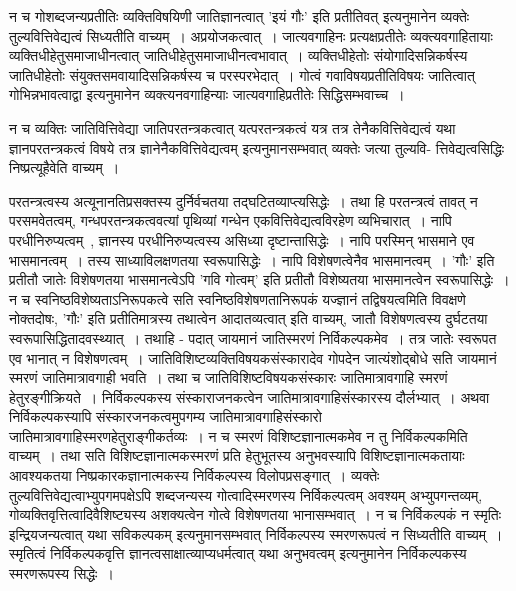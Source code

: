 				न च गोशब्दजन्यप्रतीतिः व्यक्तिविषयिणी जातिज्ञानत्वात् 'इयं गौः' इति प्रतीतिवत् इत्यनुमानेन व्यक्तेः तुल्यवित्तिवेद्यत्वं सिध्यतीति वाच्यम्~। अप्रयोजकत्वात्~। जात्यवगाहिनः प्रत्यक्षप्रतीतेः व्यक्त्यवगाहितायाः व्यक्तिधीहेतुसमाजाधीनत्वात् जातिधीहेतुसमाजाधीनत्वभावात्~। व्यक्तिधीहेतोः संयोगादिसन्निकर्षस्य जातिधीहेतोः संयुक्तसमवायादिसन्निकर्षस्य च परस्परभेदात्~। गोत्वं गवाविषयप्रतीतिविषयः जातित्वात् गोभिन्नभावत्वाद्वा इत्यनुमानेन व्यक्त्यनवगाहिन्याः जात्यवगाहिप्रतीतेः सिद्धिसम्भवाच्च~। 

				न च व्यक्तिः जातिवित्तिवेद्या जातिपरतन्त्रकत्वात् यत्परतन्त्रकत्वं यत्र तत्र तेनैकवित्तिवेद्यत्वं यथा ज्ञानपरतन्त्रकत्वं विषये तत्र ज्ञानेनैकवित्तिवेद्यत्वम् इत्यनुमानसम्भवात् व्यक्तेः जत्या तुल्यवि- त्तिवेद्यत्वसिद्धिः निष्प्रत्यूहैवेति वाच्यम्~।

				परतन्त्रत्वस्य अत्यूनानतिप्रसक्तस्य दुर्निर्वचतया तद्घटितव्याप्त्यसिद्धेः~। तथा हि परतन्त्रत्वं तावत् न परसमवेतत्वम्, गन्धपरतन्त्रकत्ववत्यां पृथिव्यां गन्धेन एकवित्तिवेद्यत्वविरहेण व्यभिचारात्~। नापि परधीनिरुप्यत्वम्~, ज्ञानस्य परधीनिरुप्यत्वस्य असिध्या दृष्टान्तासिद्धेः~। नापि परस्मिन् भासमाने एव भासमानत्वम्~। तस्य साध्याविलक्षणतया स्वरूपासिद्धेः~। नापि विशेषणत्वेनैव भासमानत्वम्~। 'गौः' इति प्रतीतौ जातेः विशेषणतया भासमानत्वेऽपि 'गवि गोत्वम्' इति प्रतीतौ विशेष्यतया भासमानत्वेन स्वरूपासिद्धेः~। न च स्वनिष्ठविशेष्यताऽनिरूपकत्वे सति स्वनिष्ठविशेषणतानिरूपकं यज्ज्ञानं तद्विषयत्वमिति विवक्षणे नोक्तदोषः, 'गौः' इति प्रतीतिमात्रस्य तथात्वेन आदातव्यत्वात् इति वाच्यम्, जातौ विशेषणत्वस्य दुर्घटतया स्वरूपासिद्धितादवस्थ्यात्~। तथाहि - पदात् जायमानं जातिस्मरणं निर्विकल्पकमेव~। तत्र जातेः स्वरूपत एव भानात् न विशेषणत्वम्~। जातिविशिष्टव्यक्तिविषयकसंस्कारादेव गोपदेन जात्यंशोद्बोधे सति जायमानं स्मरणं जातिमात्रावगाही भवति~। तथा च जातिविशिष्टविषयकसंस्कारः जातिमात्रावगाहि स्मरणं हेतुरङ्गीक्रियते~। निर्विकल्पकस्य संस्काराजनकत्वेन जातिमात्रावगाहिसंस्कारस्य दौर्लभ्यात्~। अथवा निर्विकल्पकस्यापि संस्कारजनकत्वमुपगम्य जातिमात्रावगाहिसंस्कारो जातिमात्रावगाहिस्मरणहेतुराङ्गीकर्तव्यः~। न च स्मरणं विशिष्टज्ञानात्मकमेव न तु निर्विकल्पकमिति वाच्यम्~। तथा सति विशिष्टज्ञानात्मकस्मरणं प्रति हेतुभूतस्य अनुभवस्यापि विशिष्टज्ञानात्मकतायाः आवश्यकतया निष्प्रकारकज्ञानात्मकस्य निर्विकल्पस्य विलोपप्रसङ्गात्~। व्यक्तेः तुल्यवित्तिवेद्यत्वाभ्युपगमपक्षेऽपि शब्दजन्यस्य गोत्वादिस्मरणस्य निर्विकल्पत्वम् अवश्यम् अभ्युपगन्तव्यम्, गोव्यक्तिवृत्तित्वादिवैशिष्ट्यस्य अशक्यत्वेन गोत्वे विशेषणतया भानासम्भवात्~। न च निर्विकल्पकं न स्मृतिः इन्द्रियजन्यत्वात् यथा सविकल्पकम् इत्यनुमानसम्भवात् निर्विकल्पस्य स्मरणरूपत्वं न सिध्यतीति वाच्यम्~। स्मृतित्वं निर्विकल्पकवृत्ति ज्ञानत्वसाक्षात्व्याप्यधर्मत्वात् यथा अनुभवत्वम् इत्यनुमानेन निर्विकल्पकस्य स्मरणरूपस्य सिद्धेः~।

